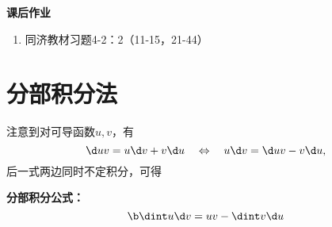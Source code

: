 \begin{ext}
 	{\bf 课后作业}
	
	\begin{enumerate}%
	  \item 同济教材习题4-2：2（11-15，21-44）
	\end{enumerate}
\end{ext}

\section{分部积分法}

注意到对可导函数$u,v$，有
$$\d uv=u\d v+v\d u\quad\Leftrightarrow\quad 
u\d v=\d uv-v\d u,$$
后一式两边同时不定积分，可得
\begin{thx}
	{\bf 分部积分公式：}
	$${\b \dint u\d v=uv-\dint v\d u}$$
\end{thx}

